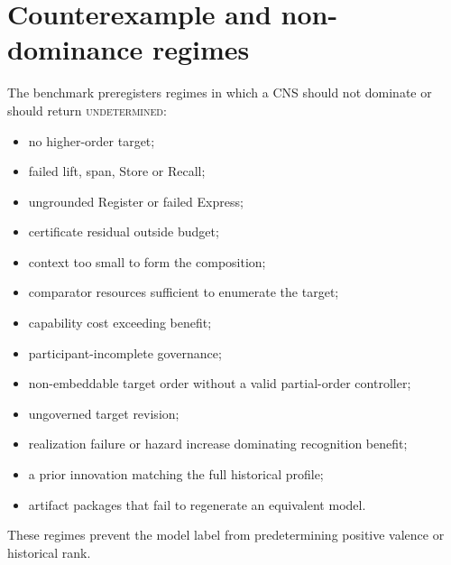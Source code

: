 \documentclass[10pt]{article}
\newcommand{\Und}{\textsc{undetermined}}
\begin{document}
\section{Counterexample and non-dominance regimes}
The benchmark preregisters regimes in which a CNS should not dominate or should return \Und:
\begin{itemize}
\item no higher-order target;
\item failed lift, span, Store or Recall;
\item ungrounded Register or failed Express;
\item certificate residual outside budget;
\item context too small to form the composition;
\item comparator resources sufficient to enumerate the target;
\item capability cost exceeding benefit;
\item participant-incomplete governance;
\item non-embeddable target order without a valid partial-order controller;
\item ungoverned target revision;
\item realization failure or hazard increase dominating recognition benefit;
\item a prior innovation matching the full historical profile;
\item artifact packages that fail to regenerate an equivalent model.
\end{itemize}
These regimes prevent the model label from predetermining positive valence or historical rank.
\end{document}
